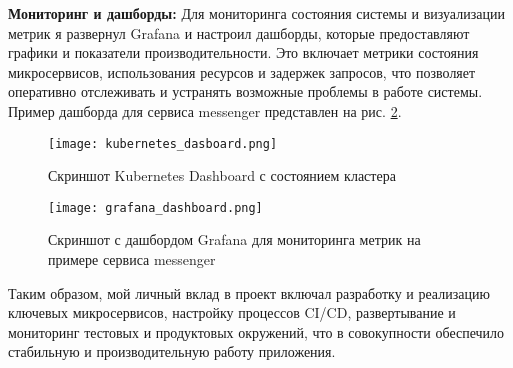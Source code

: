 \textbf{Мониторинг и дашборды:}
Для мониторинга состояния системы и визуализации метрик я развернул Grafana и настроил дашборды, которые предоставляют графики и показатели производительности. Это включает метрики состояния микросервисов, использования ресурсов и задержек запросов, что позволяет оперативно отслеживать и устранять возможные проблемы в работе системы. Пример дашборда для сервиса messenger представлен на рис. \ref{grafana_dasboard}.

\begin{figure}[h!]
    \centering
    \texttt{[image: kubernetes\_dasboard.png]}
    \caption{Скриншот Kubernetes Dashboard с состоянием кластера}
    \label{kubernetes_dashboard}
\end{figure}

\begin{figure}[h!]
    \centering
    \texttt{[image: grafana\_dashboard.png]}
    \caption{Скриншот с дашбордом Grafana для мониторинга метрик на примере сервиса messenger}
    \label{grafana_dasboard}
\end{figure}

Таким образом, мой личный вклад в проект включал разработку и реализацию ключевых микросервисов, настройку процессов CI/CD, развертывание и мониторинг тестовых и продуктовых окружений, что в совокупности обеспечило стабильную и производительную работу приложения.
